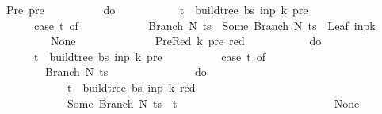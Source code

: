 \begin{isabellebody}
\ \ \ \ {\isacharbar}{\kern0pt}\ Pre\ pre\ {\isasymRightarrow}\ {\isacharparenleft}{\kern0pt}\isanewline
\ \ \ \ \ \ \ \ do\ {\isacharbraceleft}{\kern0pt}\isanewline
\ \ \ \ \ \ \ \ \ \ t\ {\isasymleftarrow}\ build{\isacharunderscore}{\kern0pt}tree{\isacharprime}{\kern0pt}\ bs\ inp\ {\isacharparenleft}{\kern0pt}k{\isacharminus}{\kern0pt}{}{\isacharparenright}{\kern0pt}\ pre{\isacharsemicolon}{\kern0pt}\isanewline
\ \ \ \ \ \ \ \ \ \ case\ t\ of\isanewline
\ \ \ \ \ \ \ \ \ \ \ \ Branch\ N\ ts\ {\isasymRightarrow}\ Some\ {\isacharparenleft}{\kern0pt}Branch\ N\ {\isacharparenleft}{\kern0pt}ts\ {\isacharat}{\kern0pt}\ {\isacharbrackleft}{\kern0pt}Leaf\ {\isacharparenleft}{\kern0pt}inp{\isacharbang}{\kern0pt}{\isacharparenleft}{\kern0pt}k{\isacharminus}{\kern0pt}{}{\isacharparenright}{\kern0pt}{\isacharparenright}{\kern0pt}{\isacharbrackright}{\kern0pt}{\isacharparenright}{\kern0pt}{\isacharparenright}{\kern0pt}\isanewline
\ \ \ \ \ \ \ \ \ \ {\isacharbar}{\kern0pt}\ {\isacharunderscore}{\kern0pt}\ {\isasymRightarrow}\ None\isanewline
\ \ \ \ \ \ \ \ {\isacharbraceright}{\kern0pt}{\isacharparenright}{\kern0pt}\isanewline
\ \ \ \ {\isacharbar}{\kern0pt}\ PreRed\ {\isacharparenleft}{\kern0pt}k{\isacharprime}{\kern0pt}{\isacharcomma}{\kern0pt}\ pre{\isacharcomma}{\kern0pt}\ red{\isacharparenright}{\kern0pt}\ {\isacharunderscore}{\kern0pt}\ {\isasymRightarrow}\ {\isacharparenleft}{\kern0pt}\isanewline
\ \ \ \ \ \ \ \ do\ {\isacharbraceleft}{\kern0pt}\isanewline
\ \ \ \ \ \ \ \ \ \ t\ {\isasymleftarrow}\ build{\isacharunderscore}{\kern0pt}tree{\isacharprime}{\kern0pt}\ bs\ inp\ k{\isacharprime}{\kern0pt}\ pre{\isacharsemicolon}{\kern0pt}\isanewline
\ \ \ \ \ \ \ \ \ \ case\ t\ of\isanewline
\ \ \ \ \ \ \ \ \ \ \ \ Branch\ N\ ts\ {\isasymRightarrow}\isanewline
\ \ \ \ \ \ \ \ \ \ \ \ \ \ do\ {\isacharbraceleft}{\kern0pt}\isanewline
\ \ \ \ \ \ \ \ \ \ \ \ \ \ \ \ t\ {\isasymleftarrow}\ build{\isacharunderscore}{\kern0pt}tree{\isacharprime}{\kern0pt}\ bs\ inp\ k\ red{\isacharsemicolon}{\kern0pt}\isanewline
\ \ \ \ \ \ \ \ \ \ \ \ \ \ \ \ Some\ {\isacharparenleft}{\kern0pt}Branch\ N\ {\isacharparenleft}{\kern0pt}ts\ {\isacharat}{\kern0pt}\ {\isacharbrackleft}{\kern0pt}t{\isacharbrackright}{\kern0pt}{\isacharparenright}{\kern0pt}{\isacharparenright}{\kern0pt}\isanewline
\ \ \ \ \ \ \ \ \ \ \ \ \ \ {\isacharbraceright}{\kern0pt}\isanewline
\ \ \ \ \ \ \ \ \ \ {\isacharbar}{\kern0pt}\ {\isacharunderscore}{\kern0pt}\ {\isasymRightarrow}\ None\isanewline
\ \ \ \ \ \ \ \ {\isacharbraceright}{\kern0pt}{\isacharparenright}{\kern0pt}\isanewline
\ \ {\isacharparenright}{\kern0pt}{\isacharparenright}{\kern0pt}{\isachardoublequoteclose}\isanewline

\end{isabellebody}

